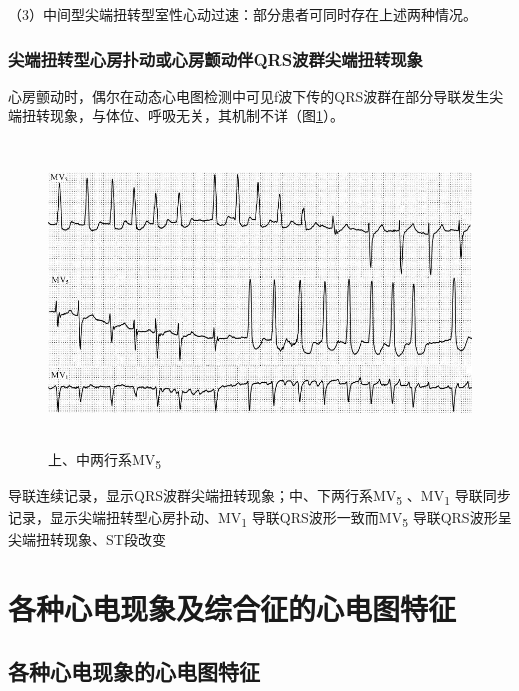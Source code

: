 （3）中间型尖端扭转型室性心动过速：部分患者可同时存在上述两种情况。

\protect\hypertarget{text00046.htmlux5cux23subid521}{}{}

\subsection{尖端扭转型心房扑动或心房颤动伴QRS波群尖端扭转现象}

心房颤动时，偶尔在动态心电图检测中可见f波下传的QRS波群在部分导联发生尖端扭转现象，与体位、呼吸无关，其机制不详（图\ref{fig39-12}）。

\begin{figure}[!htbp]
 \centering
 \includegraphics[width=5.58333in,height=3.17708in]{./images/Image00661.jpg}
 \captionsetup{justification=centering}
 \caption{上、中两行系MV\textsubscript{5}}
 \label{fig39-12}
  \end{figure} 
导联连续记录，显示QRS波群尖端扭转现象；中、下两行系MV\textsubscript{5}
、MV\textsubscript{1}
导联同步记录，显示尖端扭转型心房扑动、MV\textsubscript{1}
导联QRS波形一致而MV\textsubscript{5} 导联QRS波形呈尖端扭转现象、ST段改变

\protect\hypertarget{text00047.html}{}{}

\protect\hypertarget{text00047.htmlux5cux23chapter47}{}{}

\chapter{各种心电现象及综合征的心电图特征}

\protect\hypertarget{text00047.htmlux5cux23subid522}{}{}

\section{各种心电现象的心电图特征}

